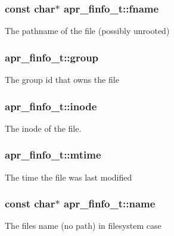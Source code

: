 \subsubsection[{\texorpdfstring{fname}{fname}}]{\setlength{\rightskip}{0pt plus 5cm}const char$\ast$ apr\+\_\+finfo\+\_\+t\+::fname}\hypertarget{structapr__finfo__t_acfed83ab2943ee7a58a215aa1cfd9e47}{}\label{structapr__finfo__t_acfed83ab2943ee7a58a215aa1cfd9e47}
The pathname of the file (possibly unrooted) 
\subsubsection[{\texorpdfstring{group}{group}}]{ apr\+\_\+finfo\+\_\+t\+::group}\hypertarget{structapr__finfo__t_a15c9c056330308de4dafb3826a9b02bc}{}\label{structapr__finfo__t_a15c9c056330308de4dafb3826a9b02bc}
The group id that owns the file 
\subsubsection[{\texorpdfstring{inode}{inode}}]{ apr\+\_\+finfo\+\_\+t\+::inode}\hypertarget{structapr__finfo__t_a73aebb666ddc391d53a871802c27eed6}{}\label{structapr__finfo__t_a73aebb666ddc391d53a871802c27eed6}
The inode of the file. 
\subsubsection[{\texorpdfstring{mtime}{mtime}}]{ apr\+\_\+finfo\+\_\+t\+::mtime}\hypertarget{structapr__finfo__t_afc3bec0f6b3b10160428ba5602a41c60}{}\label{structapr__finfo__t_afc3bec0f6b3b10160428ba5602a41c60}
The time the file was last modified 
\subsubsection[{\texorpdfstring{name}{name}}]{\setlength{\rightskip}{0pt plus 5cm}const char$\ast$ apr\+\_\+finfo\+\_\+t\+::name}\hypertarget{structapr__finfo__t_a2915f9141ea76ae3672ccf9eb0fa77bb}{}\label{structapr__finfo__t_a2915f9141ea76ae3672ccf9eb0fa77bb}
The file\textquotesingle{}s name (no path) in filesystem case 
